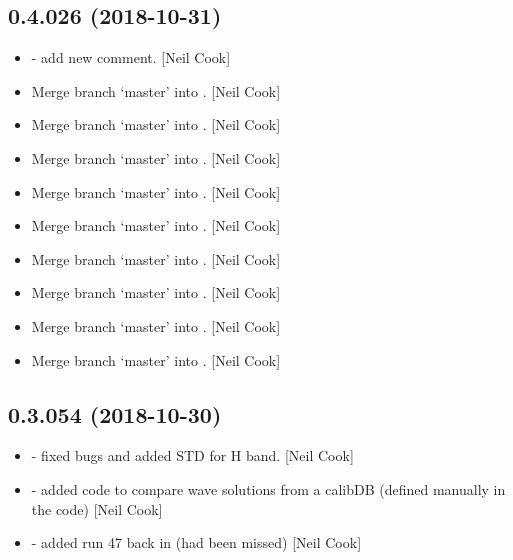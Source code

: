 \documentclass[a4paper,10pt,english]{report}
\begin{document}
\subsection{0.4.026 (2018-10-31)}
\label{\detokenize{misc/changelog:id276}}\begin{itemize}
\item {} 
 - add new comment. {[}Neil Cook{]}

\item {} 
Merge branch ‘master’ into . {[}Neil Cook{]}

\item {} 
Merge branch ‘master’ into . {[}Neil Cook{]}

\item {} 
Merge branch ‘master’ into . {[}Neil Cook{]}

\item {} 
Merge branch ‘master’ into . {[}Neil Cook{]}

\item {} 
Merge branch ‘master’ into . {[}Neil Cook{]}

\item {} 
Merge branch ‘master’ into . {[}Neil Cook{]}

\item {} 
Merge branch ‘master’ into . {[}Neil Cook{]}

\item {} 
Merge branch ‘master’ into . {[}Neil Cook{]}

\item {} 
Merge branch ‘master’ into . {[}Neil Cook{]}

\end{itemize}


\subsection{0.3.054 (2018-10-30)}
\label{\detokenize{misc/changelog:id277}}\begin{itemize}
\item {} 
 - fixed bugs and added STD for H band. {[}Neil Cook{]}

\item {} 
 - added code to compare wave solutions from a calibDB
(defined manually in the code) {[}Neil Cook{]}

\item {} 
 - added run 47 back in (had been missed) {[}Neil Cook{]}

\end{itemize}
\end{document}
